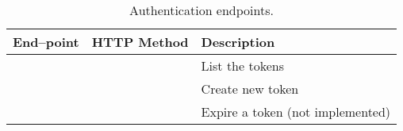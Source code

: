 \begin{table}[htpb]
    \centering
    \begin{tabu} to \textwidth {lX[c]l}
        End--point                         & HTTP Method & Description                                     \\
        \midrule
                        &          & List the tokens                          \\
                        &         & Create new token                         \\
                   &       & Expire a token (not implemented)         \\
    \end{tabu}
    \caption{Authentication endpoints.}
    \label{tab:rest_auth}
\end{table}
